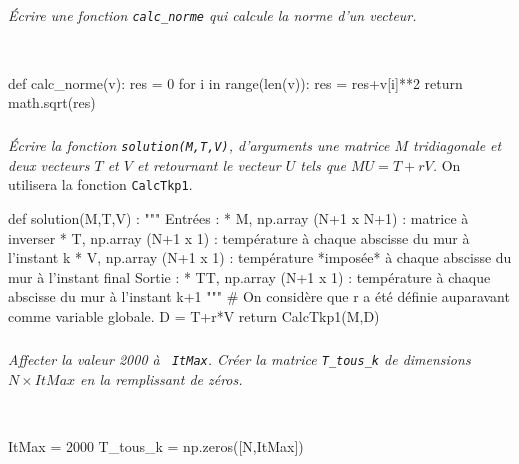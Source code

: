 \documentclass[10pt,fleqn]{article} %
\begin{document}
\fi

\subparagraph{}
\textit{Écrire une fonction \texttt{calc\_norme} qui calcule la norme d'un vecteur. }
\ifprof
\begin{corrige}
 ~\\
\begin{python}
def calc_norme(v):
    res = 0
    for i in range(len(v)):
        res = res+v[i]**2
    return math.sqrt(res)        
\end{python}
\end{corrige}
\else
\fi

\subparagraph{\label{q_solve}}
\textit{Écrire la fonction \texttt{solution(M,T,V)}, d'arguments une matrice $M$
 tridiagonale et deux vecteurs $T$ et $V$ et retournant le vecteur $U$ tels que $MU=T+rV$.}
 On utilisera la fonction \texttt{CalcTkp1}.
\ifprof   
\begin{corrige}
\begin{python}
def solution(M,T,V) :
    """
    Entrées : 
        * M, np.array (N+1 x N+1) : matrice à inverser
        * T, np.array (N+1 x 1) : température à chaque abscisse du mur à l'instant k
        * V, np.array (N+1 x 1) : température *imposée* à chaque abscisse du mur à l'instant final
    Sortie : 
        * TT, np.array (N+1 x 1) : température à chaque abscisse du mur à l'instant k+1
    """
    # On considère que r a été définie auparavant comme variable globale.
    D = T+r*V
    return CalcTkp1(M,D)
\end{python}
\end{corrige}
\else
\fi

\subparagraph{}
\textit{Affecter la valeur 2000 à  \texttt{ ItMax}. Créer la matrice  \texttt{T\_tous\_k}  de dimensions $N\times ItMax$ en la remplissant de zéros.}
\ifprof
\begin{corrige}
~\\
\begin{python}
ItMax = 2000
T_tous_k = np.zeros([N,ItMax])
\end{python}
\end{corrige}
\else
\fi
\end{document}
